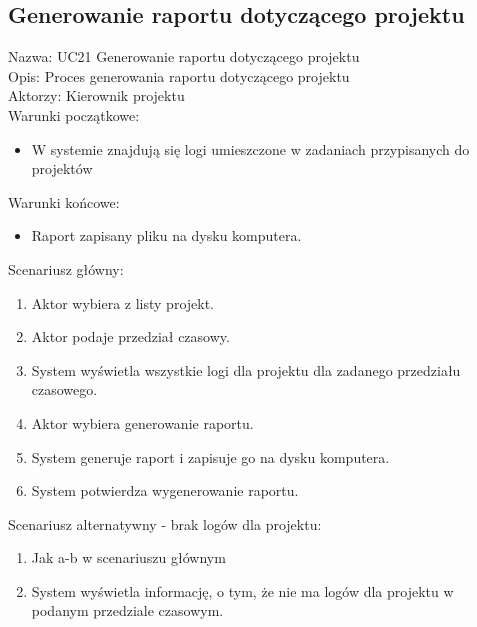 \subsection{Generowanie raportu dotyczącego projektu}
\begin{adjustwidth}{5em}{0pt}
Nazwa: UC21 Generowanie raportu dotyczącego projektu \\
Opis: Proces generowania raportu dotyczącego projektu \\
Aktorzy: Kierownik projektu \\
Warunki początkowe:
\begin{itemize}
\item W systemie znajdują się logi umieszczone w zadaniach przypisanych do projektów
\end{itemize}
Warunki końcowe:
\begin{itemize}
\item Raport zapisany pliku na dysku komputera.
\end{itemize}
Scenariusz główny:
\begin{enumerate}
\item Aktor wybiera z listy projekt.
\item Aktor podaje przedział czasowy.
\item System wyświetla wszystkie logi dla projektu dla zadanego przedziału czasowego.
\item Aktor wybiera generowanie raportu.
\item System generuje raport i zapisuje go na dysku komputera.
\item System potwierdza wygenerowanie raportu.
\end{enumerate}
Scenariusz alternatywny - brak logów dla projektu: 
\begin{enumerate}
\item Jak a-b w scenariuszu głównym
\item System wyświetla informację, o tym, że nie ma logów dla projektu w podanym przedziale czasowym.
\end{enumerate}

\end{adjustwidth}

